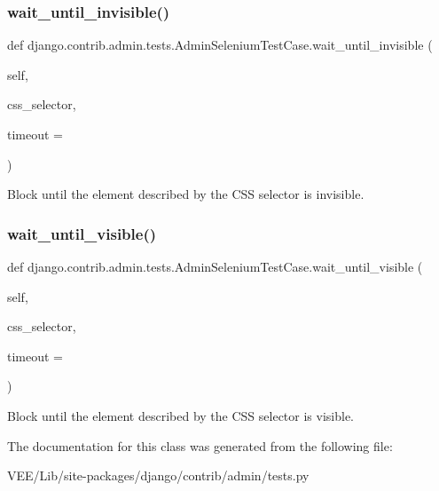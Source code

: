 \subsubsection{\texorpdfstring{wait\+\_\+until\+\_\+invisible()}{wait\_until\_invisible()}}
{\footnotesize\ttfamily def django.\+contrib.\+admin.\+tests.\+Admin\+Selenium\+Test\+Case.\+wait\+\_\+until\+\_\+invisible (\begin{DoxyParamCaption}\item[{}]{self,  }\item[{}]{css\+\_\+selector,  }\item[{}]{timeout = {} }\end{DoxyParamCaption})}

\begin{DoxyVerb}Block until the element described by the CSS selector is invisible.
\end{DoxyVerb}
 \mbox{\label{classdjango_1_1contrib_1_1admin_1_1tests_1_1_admin_selenium_test_case_ae899ddfb6e7c28a14cce469504316cbc}} 
\subsubsection{\texorpdfstring{wait\+\_\+until\+\_\+visible()}{wait\_until\_visible()}}
{\footnotesize\ttfamily def django.\+contrib.\+admin.\+tests.\+Admin\+Selenium\+Test\+Case.\+wait\+\_\+until\+\_\+visible (\begin{DoxyParamCaption}\item[{}]{self,  }\item[{}]{css\+\_\+selector,  }\item[{}]{timeout = {} }\end{DoxyParamCaption})}

\begin{DoxyVerb}Block until the element described by the CSS selector is visible.
\end{DoxyVerb}
 

The documentation for this class was generated from the following file\+:\begin{DoxyCompactItemize}
\item 
V\+E\+E/\+Lib/site-\/packages/django/contrib/admin/tests.\+py\end{DoxyCompactItemize}
